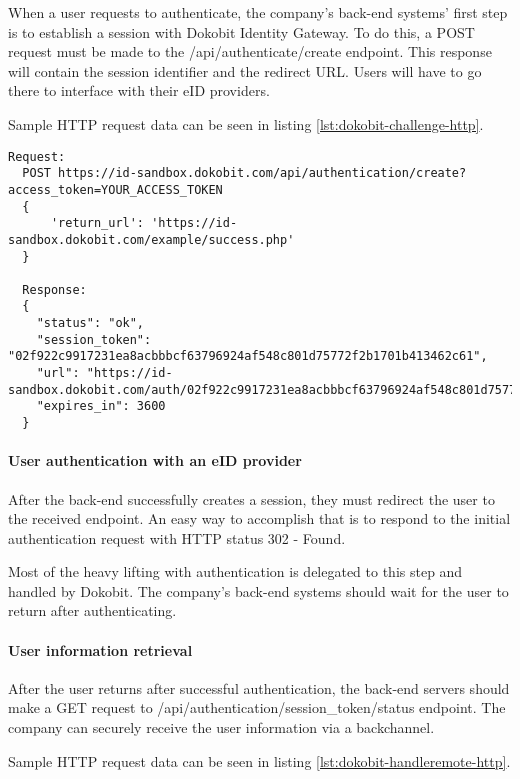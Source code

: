 When a user requests to authenticate, the company's back-end systems' first step is to establish a session with Dokobit Identity Gateway. To do this, a {POST} request must be made to the {/api/authenticate/create} endpoint. This response will contain the session identifier and the redirect URL. Users will have to go there to interface with their eID providers.

Sample HTTP request data can be seen in listing \ref{lst:dokobit-challenge-http}.

\begin{lstlisting}[caption={Handling Dokobit session creation}, label={lst:dokobit-challenge-http}]
  Request:
  POST https://id-sandbox.dokobit.com/api/authentication/create?access_token=YOUR_ACCESS_TOKEN
  {
      'return_url': 'https://id-sandbox.dokobit.com/example/success.php'
  }
  
  Response:
  {
    "status": "ok",
    "session_token": "02f922c9917231ea8acbbbcf63796924af548c801d75772f2b1701b413462c61",
    "url": "https://id-sandbox.dokobit.com/auth/02f922c9917231ea8acbbbcf63796924af548c801d75772f2b1701b413462c61",
    "expires_in": 3600
  }
\end{lstlisting}

\paragraph{User authentication with an eID provider}

After the back-end successfully creates a session, they must redirect the user to the received endpoint. An easy way to accomplish that is to respond to the initial authentication request with HTTP status 302 - Found.

Most of the heavy lifting with authentication is delegated to this step and handled by Dokobit. The company's back-end systems should wait for the user to return after authenticating.

\paragraph{User information retrieval}

After the user returns after successful authentication, the back-end servers should make a {GET} request to {/api/authentication/session\_token/status} endpoint. The company can securely receive the user information via a backchannel.

Sample HTTP request data can be seen in listing \ref{lst:dokobit-handleremote-http}.

